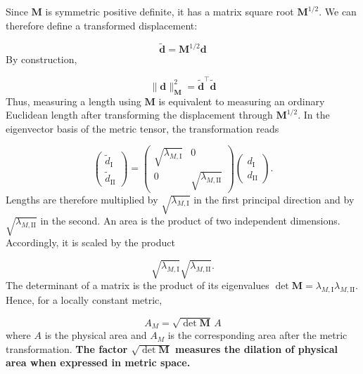 \documentclass[11pt,a4paper]{article}
\begin{document}
\noindent
Since $\mathbf M$ is symmetric positive definite, it has a matrix square root $\mathbf M^{1/2}$. We can therefore define a transformed displacement:

\begin{equation}
\widetilde{\mathbf d}=\mathbf M^{1/2}\mathbf d
\end{equation}
\noindent
By construction,

\begin{equation}
\|\mathbf d\|_{\mathbf M}^{2}
=\widetilde{\mathbf d}^{\top}\widetilde{\mathbf d}
\end{equation}
\noindent
Thus, measuring a length using $\mathbf M$ is equivalent to measuring an ordinary Euclidean length after transforming the displacement through $\mathbf M^{1/2}$. In the eigenvector basis of the metric tensor, the transformation reads

\begin{equation}
\begin{pmatrix}
\widetilde d_{\mathrm I}\\
\widetilde d_{\mathrm{II}}
\end{pmatrix}
=
\begin{pmatrix}
\sqrt{\lambda_{M,\mathrm I}}&0\\
0&\sqrt{\lambda_{M,\mathrm{II}}}
\end{pmatrix}
\begin{pmatrix}
d_{\mathrm I}\\
d_{\mathrm{II}}
\end{pmatrix}.
\end{equation}
\noindent
Lengths are therefore multiplied by $\sqrt{\lambda_{M,\mathrm I}}$ in the first principal direction and by $\sqrt{\lambda_{M,\mathrm{II}}}$ in the second. An area is the product of two independent dimensions. Accordingly, it is scaled by the product

\begin{equation}
\sqrt{\lambda_{M,\mathrm I}}
\sqrt{\lambda_{M,\mathrm{II}}}.
\end{equation}
\noindent
The determinant of a matrix is the product of its eigenvalues $\det\mathbf M
=\lambda_{M,\mathrm I}\lambda_{M,\mathrm{II}}$. Hence, for a locally constant metric,

\begin{equation}
\boxed{
A_M=\sqrt{\det\mathbf M}\,A
}
\end{equation}
\noindent
where $A$ is the physical area and $A_M$ is the corresponding area after the metric transformation. \textbf{The factor $\sqrt{\det\mathbf M}$ measures the dilation of physical area when expressed in metric space.}\\
\end{document}
